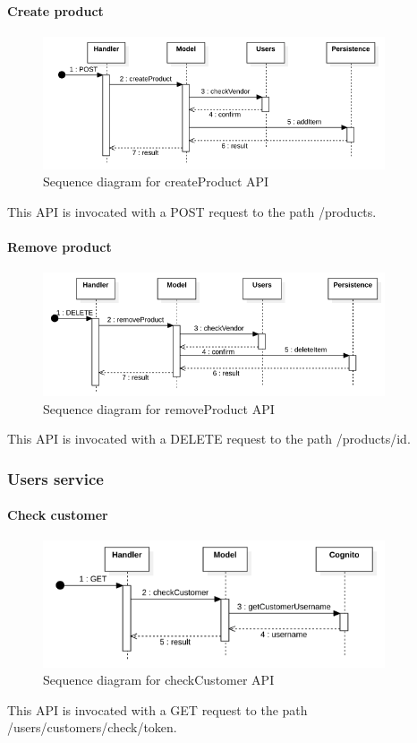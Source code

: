 \paragraph*{Create product}
\begin{figure}[H]
    \includegraphics[width=0.9\textwidth]{res/images/sequence-diagrams/products/createProduct.png}
    \caption{Sequence diagram for createProduct API}
\end{figure}
This API is invocated with a POST request to the path /products.

\paragraph*{Remove product}
\begin{figure}[H]
    \includegraphics[width=0.9\textwidth]{res/images/sequence-diagrams/products/removeProduct.png}
    \caption{Sequence diagram for removeProduct API}
\end{figure}
This API is invocated with a DELETE request to the path /products/{id}.


\subsubsection{Users service}
\paragraph*{Check customer}
\begin{figure}[H]
    \includegraphics[width=0.9\textwidth]{res/images/sequence-diagrams/users/checkCustomer.png}
    \caption{Sequence diagram for checkCustomer API}
\end{figure}
This API is invocated with a GET request to the path /users/customers/check/{token}.
